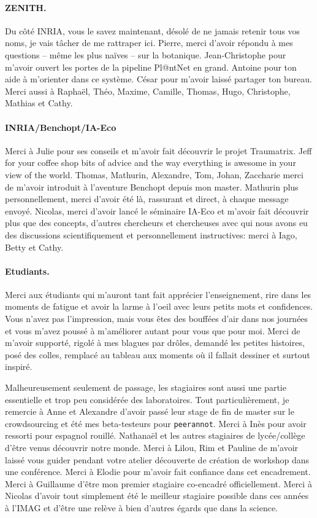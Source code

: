 \paragraph*{ZENITH.}
Du côté INRIA, vous le savez maintenant, désolé de ne jamais retenir tous vos noms, je vais tâcher de me rattraper ici.
Pierre, merci d'avoir répondu à mes questions -- même les plus naïves -- sur la botanique. Jean-Christophe pour m'avoir ouvert les portes de la pipeline Pl@ntNet en grand. Antoine pour ton aide à m'orienter dans ce système.
César pour m'avoir laissé partager ton bureau.
Merci aussi à Raphaël, Théo, Maxime, Camille, Thomas, Hugo, Christophe, Mathias et Cathy.

\medskip

\paragraph*{INRIA/Benchopt/IA-Eco}
Merci à Julie pour ses conseils et m'avoir fait découvrir le projet Traumatrix.
Jeff for your coffee shop bits of advice and the way everything is awesome in your view of the world.
Thomas, Mathurin, Alexandre, Tom, Johan, Zaccharie merci de m'avoir introduit à l'aventure Benchopt depuis mon master.
Mathurin plus personnellement, merci d'avoir été là, rassurant et direct, à chaque message envoyé.
Nicolas, merci d'avoir lancé le séminaire IA-Eco et m'avoir fait découvrir plus que des concepts, d'autres chercheurs et chercheuses avec qui nous avons eu des discussions scientifiquement et personnellement instructives: merci à Iago, Betty et Cathy.

\medskip

\paragraph*{Etudiants.}
Merci aux étudiants qui m'auront tant fait apprécier l'enseignement, rire dans les moments de fatigue et avoir la larme à l'oeil avec leurs petits mots et confidences.
Vous n'avez pas l'impression, mais vous êtes des bouffées d'air dans nos journées et vous m'avez poussé à m'améliorer autant pour vous que pour moi.
Merci de m'avoir supporté, rigolé à mes blagues par drôles, demandé les petites histoires, posé des colles, remplacé au tableau aux moments où il fallait dessiner et surtout inspiré.

Malheureusement seulement de passage, les stagiaires sont aussi une partie essentielle et trop peu considérée des laboratoires.
Tout particulièrement, je remercie à Anne et Alexandre d'avoir passé leur stage de fin de master sur le crowdsourcing et été mes beta-testeurs pour \texttt{peerannot}.
Merci à Inès pour avoir ressorti pour espagnol rouillé.
Nathanaël et les autres stagiaires de lycée/collège d'être venus découvrir notre monde.
Merci à Lilou, Rim et Pauline de m'avoir laissé vous guider pendant votre atelier découverte de création de workshop dans une conférence.
Merci à Elodie pour m'avoir fait confiance dans cet encadrement.
Merci à Guillaume d'être mon premier stagiaire co-encadré officiellement.
Merci à Nicolas d'avoir tout simplement été le meilleur stagiaire possible dans ces années à l'IMAG et d'être une relève à bien d'autres égards que dans la science.

